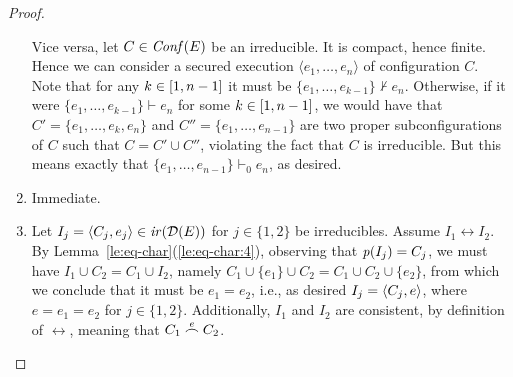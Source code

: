 \begin{proof}
\begin{enumerate}
    Vice versa, let $C \in \mathit{Conf}({{E}})$ be an irreducible. It is
    compact, hence finite. Hence we can consider a secured execution
    $\langle e_1, \ldots, e_{n} \rangle$
    of configuration $C$. Note that for any $k \in [{1},{n-1}]$ it
    must be $\{ e_1, \ldots, e_{k-1} \} \not\vdash e_n$.
    Otherwise, if it were $\{ e_1, \ldots, e_{k-1} \} \vdash e_n$ for
    some $k \in [{1},{n-1}]$, we would have that $C' = \{
    e_1, \ldots, e_{k}, e_n \}$ and $C'' = \{ e_1, \ldots, e_{n-1} \}$
    are two proper subconfigurations of $C$ such that $C = C'
    \cup C''$, violating the fact that $C$ is irreducible. But this
    means exactly that $\{ e_1, \ldots, e_{n-1} \} \vdash_0 e_n$, as
    desired.

  \medskip
  
\item Immediate.

  \medskip

  



\item Let $I_j = \langle{C_j}, {e_j}\rangle \in \mathop{\mathit{ir}({\mathcal{D}({{E}})})}$ for
  $j \in \{1,2\}$ be irreducibles. Assume $I_1 \leftrightarrow I_2$.
  By Lemma~\ref{le:eq-char}(\ref{le:eq-char:4}), observing that
  $\mathit{p}({I_j}) = C_j$, we must have $I_1 \cup C_2 = C_1 \cup I_2$,
  namely $C_1 \cup \{e_1\} \cup C_2 = C_1 \cup C_2 \cup \{ e_2\}$,
  from which we conclude that it must be $e_1 = e_2$, i.e., as desired
  $I_j = \langle{C_j}, {e}\rangle$, where $e = e_1 = e_2$ for $j \in \{ 1,2 \}$.
  Additionally, $I_1$ and $I_2$ are consistent, by definition of
  $\leftrightarrow$,
  meaning that $C_1 \stackrel{e}{\frown} C_2$.


\end{enumerate}
\end{proof}
